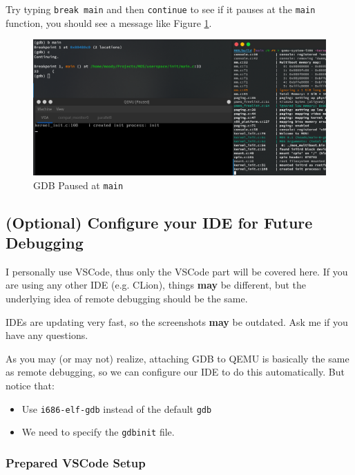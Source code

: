 Try typing \texttt{break main} and then \texttt{continue} to see if it pauses at the \texttt{main}
function, you should see a message like Figure \ref{fig:gdb-paused}.

\begin{figure}[ht]
    \centering
    \includegraphics[width=\textwidth]{assets/c1.gdb-paused.png}
    \caption{GDB Paused at \texttt{main}}
    \label{fig:gdb-paused}
\end{figure}

\subsection{(Optional) Configure your IDE for Future Debugging} \label{sec:ide-config}

\begin{note}
    \item I personally use VSCode, thus only the VSCode part will be covered here. If you are
    using any other IDE (e.g. CLion), things \textbf{may} be different, but the underlying idea
    of remote debugging should be the same.

    \item IDEs are updating very fast, so the screenshots \textbf{may} be outdated. Ask me if you
    have any questions.
\end{note}

As you may (or may not) realize, attaching GDB to QEMU is basically the same as remote debugging, so
we can configure our IDE to do this automatically. But notice that:

\begin{itemize}
    \item Use \texttt{i686-elf-gdb} instead of the default \texttt{gdb}
    \item We need to specify the \texttt{gdbinit} file.
\end{itemize}

\subsubsection{Prepared VSCode Setup} \label{sec:vscode-config}

